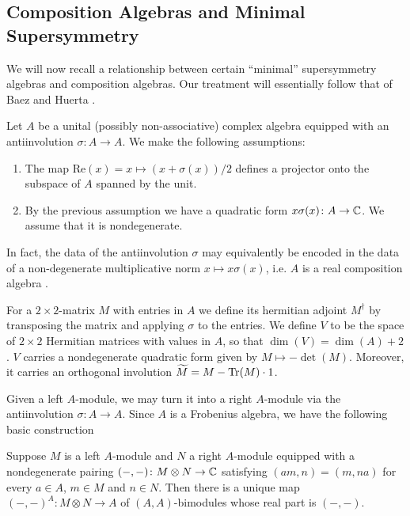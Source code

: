 \documentclass[10pt, oneside]{article}
\renewcommand{\Re}{\mathrm{Re}}
\begin{document}
\subsection{Composition Algebras and Minimal Supersymmetry}
\label{sect:compositionalgebras}

We will now recall a relationship between certain ``minimal'' supersymmetry algebras and composition algebras. Our treatment will essentially follow that of Baez and Huerta \cite{BaezHuerta}.

Let $A$ be a unital (possibly non-associative) complex algebra equipped with an antiinvolution $\sigma\colon A\rightarrow A$. We make the following assumptions:
\begin{enumerate}
\item The map $\Re(x)=x\mapsto (x + \sigma(x))/2$ defines a projector onto the subspace of $A$ spanned by the unit.

\item By the previous assumption we have a quadratic form $x\sigma(x)\colon A\rightarrow \mathbb C$. We assume that it is nondegenerate.
\end{enumerate}

In fact, the data of the antiinvolution $\sigma$ may equivalently be encoded in the data of a non-degenerate multiplicative norm $x\mapsto x\sigma(x)$, i.e. $A$ is a real composition algebra \cite[Chapter 1.3]{SpringerVeldkamp}.

For a $2\times 2$-matrix $M$ with entries in $A$ we define its hermitian adjoint $M^\dagger$ by transposing the matrix and applying $\sigma$ to the entries. We define $V$ to be the space of $2\times 2$ Hermitian matrices with values in $A$, so that $\dim(V) = \dim(A) + 2$. $V$ carries a nondegenerate quadratic form given by $M\mapsto -\det(M)$. Moreover, it carries an orthogonal involution $\widetilde{M} = M - \operatorname{Tr}(M)\cdot 1$.

Given a left $A$-module, we may turn it into a right $A$-module via the antiinvolution $\sigma\colon A\rightarrow A$. Since $A$ is a Frobenius algebra, we have the following basic construction 

\begin{lemma}
Suppose $M$ is a left $A$-module and $N$ a right $A$-module equipped with a nondegenerate pairing $(-, -)\colon M\otimes N\rightarrow \mathbb C$ satisfying $(am, n) = (m, na)$ for every $a\in A$, $m\in M$ and $n\in N$. Then there is a unique map $(-, -)^A\colon M\otimes N\rightarrow A$ of $(A, A)$-bimodules whose real part is $(-, -)$.
\label{lm:extendpairing}
\end{lemma}
\end{document}
